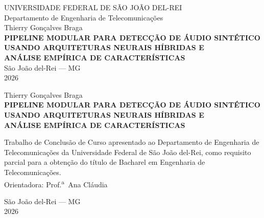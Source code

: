 \documentclass[12pt,a4paper]{article}
\begin{document}
\pagestyle{empty}

\begin{center}
{\large UNIVERSIDADE FEDERAL DE SÃO JOÃO DEL-REI}\\[0.3cm]
{\normalsize Departamento de Engenharia de Telecomunicações}\\[2.0cm]

{\large Thierry Gonçalves Braga}\\[2.0cm]

{\Large\bfseries
PIPELINE MODULAR PARA DETECÇÃO DE ÁUDIO SINTÉTICO\\[0.3cm]
USANDO ARQUITETURAS NEURAIS HÍBRIDAS E\\[0.3cm]
ANÁLISE EMPÍRICA DE CARACTERÍSTICAS}\\[6.0cm]

{\normalsize São João del-Rei --- MG\\
2026}
\end{center}
\newpage

\begin{center}
{\large Thierry Gonçalves Braga}\\[3.0cm]

{\Large\bfseries
PIPELINE MODULAR PARA DETECÇÃO DE ÁUDIO SINTÉTICO\\[0.3cm]
USANDO ARQUITETURAS NEURAIS HÍBRIDAS E\\[0.3cm]
ANÁLISE EMPÍRICA DE CARACTERÍSTICAS}\\[2.0cm]
\end{center}

\hfill\begin{minipage}{8.5cm}
\begin{singlespace}
\noindent Trabalho de Conclusão de Curso apresentado ao Departamento de
Engenharia de Telecomunicações da Universidade Federal de São João del-Rei,
como requisito parcial para a obtenção do título de Bacharel em Engenharia de
Telecomunicações.\\[0.5cm]
Orientadora: Prof.\textsuperscript{a}\ Ana Cláudia
\end{singlespace}
\end{minipage}

\vfill
\begin{center}
{\normalsize São João del-Rei --- MG\\
2026}
\end{center}
\newpage
\end{document}

